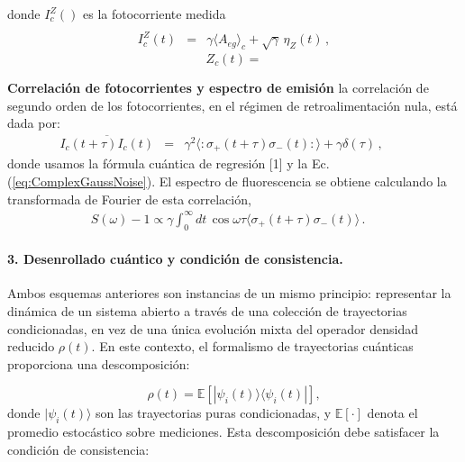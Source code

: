 \documentclass[12pt]{report}
\begin{document}
donde $I_c^Z()$ es la fotocorriente medida 
% 
\begin{subequations}
\begin{eqnarray}
 \\
I_c^Z(t) &=& \gamma \langle A_{eg} \rangle_c + \sqrt{\gamma} \, \eta_Z(t)	\,,	\label{HeterodyneSSE}
\end{eqnarray}
\end{subequations}
\begin{equation}
Z_c(t) = 
\end{equation}



\textbf{Correlaci\'on de  fotocorrientes y espectro de emisión} 
 la correlación de segundo orden de los fotocorrientes, en el régimen de retroalimentación nula, está dada por:
%
\begin{eqnarray} 	 \label{HomodyneAutoCorr}
\overline{ I_c(t+\tau) I_c(t) } &=& \gamma^2 
	\langle : \sigma_+ (t+\tau) \sigma_- (t) : \rangle 
	+\gamma \delta (\tau) \,, \qquad
\end{eqnarray}
donde usamos la f\'ormula cu\'antica de regresi\'on [1] y la 
Ec.(\ref{eq:ComplexGaussNoise}). El espectro de fluorescencia se 
obtiene calculando la transformada de Fourier de esta correlaci\'on, 
%
\begin{eqnarray} 	 \label{SpectrumHom}
S(\omega)-1 \propto \gamma \int_0^{\infty} dt\, \cos{\omega \tau} 
	\langle  \sigma_+ (t+\tau) \sigma_- (t)  \rangle \,. \quad
\end{eqnarray}
\paragraph{3. Desenrollado cuántico y condición de consistencia.}

Ambos esquemas anteriores son instancias de un mismo principio: representar la dinámica de un sistema abierto a través de una colección de trayectorias condicionadas, en vez de una única evolución mixta del operador densidad reducido \( \rho(t) \). En este contexto, el formalismo de trayectorias cuánticas proporciona una descomposición:

\begin{equation}
\rho(t) = \mathbb{E}\left[ |\psi_i(t)\rangle \langle \psi_i(t) | \right],
\end{equation}
donde \( |\psi_i(t)\rangle \) son las trayectorias puras condicionadas, y \( \mathbb{E}[\cdot] \) denota el promedio estocástico sobre mediciones. Esta descomposición debe satisfacer la condición de consistencia:
\end{document}
